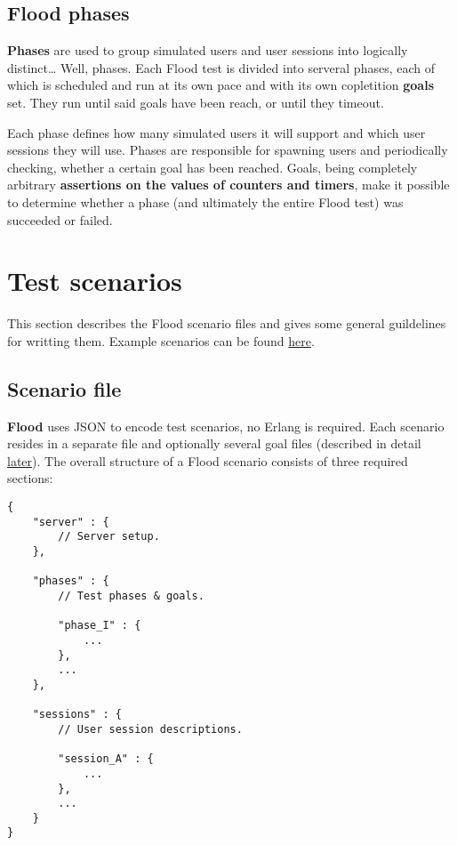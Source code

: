 \documentclass[a4paper]{article}
\begin{document}
\subsection{Flood phases}
\label{sec-2-3}
\label{ref-goals}


\textbf{Phases} are used to group simulated users and user sessions into logically distinct\ldots{} Well, phases. Each Flood test is divided into serveral phases, each of which is scheduled and run at its own pace and with its own copletition \textbf{goals} set. They run until said goals have been reach, or until they timeout.

\noindent
Each phase defines how many simulated users it will support and which user sessions they will use. Phases are responsible for spawning users and periodically checking, whether a certain goal has been reached. Goals, being completely arbitrary \textbf{assertions on the values of counters and timers}, make it possible to determine whether a phase (and ultimately the entire Flood test) was succeeded or failed.

\pagebreak
\section{Test scenarios}
\label{sec-3}
\label{ref-scenarios}


This section describes the Flood scenario files and gives some general guildelines for writting them. Example scenarios can be found \hyperref[sec-3-7]{here}.
\subsection{Scenario file}
\label{sec-3-1}

\textbf{Flood} uses JSON to encode test scenarios, no Erlang is required. Each scenario resides in a separate file and optionally several goal files (described in detail \hyperref[sec-4-2]{later}). The overall structure of a Flood scenario consists of three required sections:


\begin{verbatim}
{
    "server" : {
        // Server setup.
    },

    "phases" : {
        // Test phases & goals.

        "phase_I" : {
            ...
        },
        ...
    },

    "sessions" : {
        // User session descriptions.

        "session_A" : {
            ...
        },
        ...
    }
}
\end{verbatim}
\end{document}
